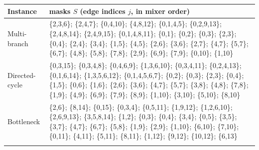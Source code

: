 \begin{longtable}{p{2.3cm}p{12.6cm}}
\toprule
Instance & masks $S$ (edge indices $j$, in mixer order) \\
\midrule\endhead
Multi-branch & \{2,3,6\}; \{2,4,7\}; \{0,4,10\}; \{4,8,12\}; \{0,1,4,5\}; \{0,2,9,13\}; \{2,4,8,14\}; \{2,4,9,15\}; \{0,1,4,8,11\}; \{0,1\}; \{0,2\}; \{0,3\}; \{2,3\}; \{0,4\}; \{2,4\}; \{3,4\}; \{1,5\}; \{4,5\}; \{2,6\}; \{3,6\}; \{2,7\}; \{4,7\}; \{5,7\}; \{6,7\}; \{4,8\}; \{5,8\}; \{7,8\}; \{2,9\}; \{6,9\}; \{7,9\}; \{0,10\}; \{1,10\} \\ \addlinespace
Directed-cycle & \{0,3,15\}; \{0,3,4,8\}; \{0,4,6,9\}; \{1,3,6,10\}; \{0,3,4,11\}; \{0,2,4,13\}; \{0,1,6,14\}; \{1,3,5,6,12\}; \{0,1,4,5,6,7\}; \{0,2\}; \{0,3\}; \{2,3\}; \{0,4\}; \{1,5\}; \{0,6\}; \{1,6\}; \{2,6\}; \{3,6\}; \{4,7\}; \{5,7\}; \{3,8\}; \{4,8\}; \{7,8\}; \{1,9\}; \{4,9\}; \{6,9\}; \{7,9\}; \{8,9\}; \{1,10\}; \{3,10\}; \{5,10\}; \{8,10\} \\ \addlinespace
Bottleneck & \{2,6\}; \{8,14\}; \{0,15\}; \{0,3,4\}; \{0,5,11\}; \{1,9,12\}; \{1,2,6,10\}; \{2,6,9,13\}; \{3,5,8,14\}; \{1,2\}; \{0,3\}; \{0,4\}; \{3,4\}; \{0,5\}; \{3,5\}; \{3,7\}; \{4,7\}; \{6,7\}; \{5,8\}; \{1,9\}; \{2,9\}; \{1,10\}; \{6,10\}; \{7,10\}; \{0,11\}; \{4,11\}; \{5,11\}; \{8,11\}; \{1,12\}; \{9,12\}; \{10,12\}; \{6,13\} \\ \addlinespace
\bottomrule
\end{longtable}
